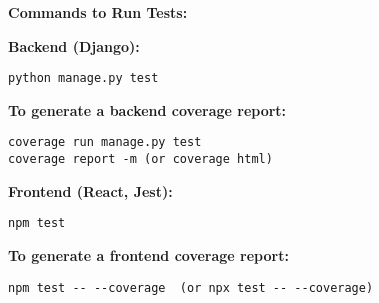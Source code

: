 \textbf{Commands to Run Tests:}

\textbf{Backend (Django):}
\begin{verbatim}
python manage.py test
\end{verbatim}

\textbf{To generate a backend coverage report:}
\begin{verbatim}
coverage run manage.py test 
coverage report -m (or coverage html)
\end{verbatim}

\textbf{Frontend (React, Jest):}
\begin{verbatim}
npm test
\end{verbatim}

\textbf{To generate a frontend coverage report:}
\begin{verbatim}
npm test -- --coverage  (or npx test -- --coverage)
\end{verbatim}

